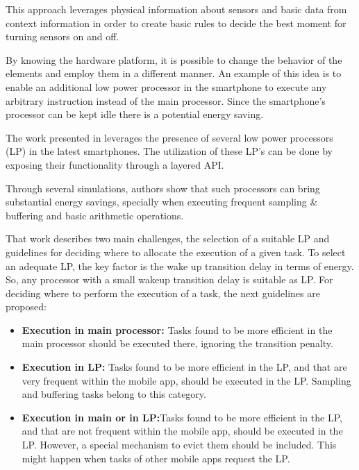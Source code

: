 This approach leverages physical information about sensors and basic data from context information in order to create basic rules to decide the best moment for turning sensors on and off.


By knowing the hardware platform, it is possible to change the behavior of the elements and employ them in a different manner.
An example of this idea is to enable an additional low power processor in the smartphone to execute any arbitrary instruction instead of the main processor.
Since the smartphone's processor can be kept idle there is a potential energy saving.

The work presented in \cite{Ra2012} leverages the presence of several low power processors (LP) in the latest smartphones.
The utilization of these LP's can be done by exposing their functionality through a layered API.

Through several simulations, authors show that such processors can bring substantial energy savings, specially when executing frequent sampling \& buffering and basic arithmetic operations.

That work describes two main challenges, the selection of a suitable LP and guidelines for deciding where to allocate the execution of a given task.
To select an adequate LP, the key factor is the wake up transition delay in terms of energy. So, any processor with a small wakeup transition delay is suitable as LP.
For deciding where to perform the execution of a task, the next guidelines are proposed:
\begin{itemize}
  \item \textbf{Execution in main processor:} {Tasks found to be more efficient in the main processor should be executed there, ignoring the transition penalty}.
  \item \textbf{Execution in LP:} {Tasks found to be more efficient in the LP, and that are very frequent within the mobile app, should be executed in the LP. Sampling and buffering tasks belong to this category}.
  \item \textbf{Execution in main or in LP:}{Tasks found to be more efficient in the LP, and  that are not frequent within the mobile app, should be executed in the LP. However, a special mechanism to evict them should be included. This might happen when tasks of other mobile apps request the LP}.
\end{itemize}


